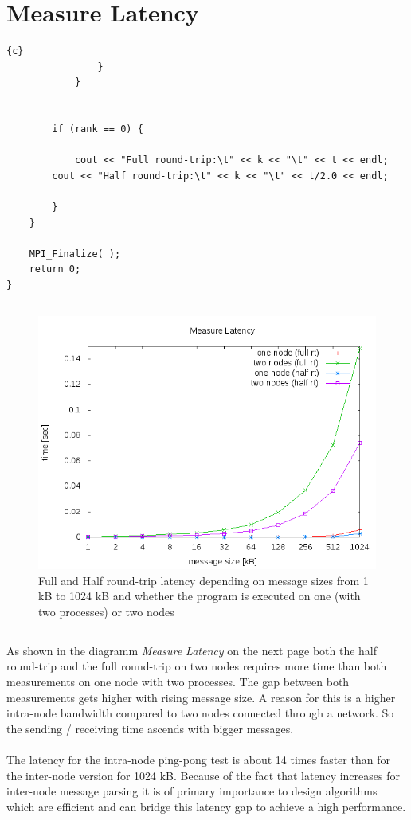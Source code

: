 \documentclass{article}
\newcommand{\enterProblemHeader}[1]{
}
\newcommand{\exitProblemHeader}[1]{
}
\newcounter{homeworkProblemCounter} %
\newcommand{\homeworkProblemName}{}
\newenvironment{homeworkProblem}[1][Problem \arabic{homeworkProblemCounter}]{ %
\stepcounter{homeworkProblemCounter} %
\renewcommand{\homeworkProblemName}{#1} %
\section{\homeworkProblemName} %
}{
}
\begin{document}
\begin{homeworkProblem}[Measure Latency]
\begin{lstlisting}{c}
                }
            }


        if (rank == 0) {

            cout << "Full round-trip:\t" << k << "\t" << t << endl;
	    cout << "Half round-trip:\t" << k << "\t" << t/2.0 << endl;
	    
        }
    }

    MPI_Finalize( );
    return 0;
}
\end{lstlisting}
\subsection{}
\begin{figure}   
        \includegraphics[scale=1.0]{measure_latency.png}
    \caption{Full and Half round-trip latency depending on message sizes from 1 kB to 1024 kB and whether the program is executed on one (with two processes) or two nodes}
\end{figure} 
\subsection{}
As shown in the diagramm \textit{Measure Latency} on the next page both the half round-trip and the full round-trip on two nodes requires more time than both measurements on one node with two processes. The gap between both measurements gets higher with rising message size. A reason for this is a higher intra-node bandwidth compared to two nodes connected through a network. So the sending / receiving time ascends with bigger messages. \\ \\
The latency for the intra-node ping-pong test is about 14 times faster than for the inter-node version for 1024 kB. 
Because of the fact that latency increases for inter-node message parsing it is of primary importance to design algorithms which are efficient and can bridge this latency gap to achieve a high performance.
\end{homeworkProblem}
\end{document}
